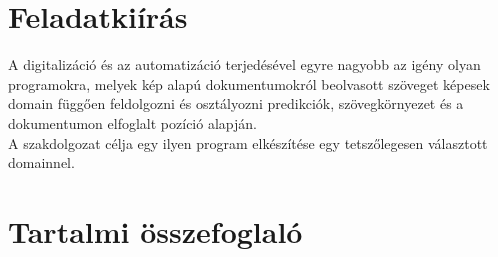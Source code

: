 \documentclass[12pt]{report}
\begin{document}
\renewcommand{\contentsname}{Tartalomjegyzék}

\chapter*{Feladatkiírás}

A digitalizáció és az automatizáció terjedésével egyre nagyobb az igény olyan programokra, melyek kép alapú dokumentumokról beolvasott szöveget képesek domain függően feldolgozni és osztályozni predikciók, szövegkörnyezet és a dokumentumon elfoglalt pozíció alapján.\\
A szakdolgozat célja egy ilyen program elkészítése egy tetszőlegesen választott domainnel.


\chapter*{Tartalmi összefoglaló}





\end{document}
